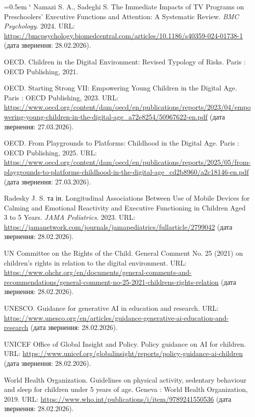 \documentclass[14pt, a4paper]{extreport}
\makeatletter
\renewcommand{\@biblabel}[1]{#1.}
\renewenvironment{thebibliography}[1]
  {\list{\@biblabel{\arabic{enumiv}}}%
     {\settowidth\labelwidth{\@biblabel{#1}}%
      \leftmargin=1.25cm
      \labelsep=0.5em
      \itemsep=0.3\baselineskip
      \parsep=0pt
      \usecounter{enumiv}%
      \let\p@enumiv\@empty
      \renewcommand\theenumiv{\arabic{enumiv}}}%
   \sloppy\clubpenalty4000\widowpenalty4000\sfcode`\.\@m}
  {\endlist}
\makeatother
\begin{document}
\begin{thebibliography}{99}
Namazi S. A., Sadeghi S. The Immediate Impacts of TV Programs on Preschoolers’ Executive Functions and Attention: A Systematic Review. \textit{BMC Psychology}. 2024. URL: \url{https://bmcpsychology.biomedcentral.com/articles/10.1186/s40359-024-01738-1} (дата звернення: 28.02.2026).

OECD. Children in the Digital Environment: Revised Typology of Risks. Paris : OECD Publishing, 2021.

OECD. Starting Strong VII: Empowering Young Children in the Digital Age. Paris : OECD Publishing, 2023. URL: \url{https://www.oecd.org/content/dam/oecd/en/publications/reports/2023/04/empowering-young-children-in-the-digital-age_a72e8254/50967622-en.pdf} (дата звернення: 27.03.2026).

OECD. From Playgrounds to Platforms: Childhood in the Digital Age. Paris : OECD Publishing, 2025. URL: \url{https://www.oecd.org/content/dam/oecd/en/publications/reports/2025/05/from-playgrounds-to-platforms-childhood-in-the-digital-age_cd2b8960/a2c18146-en.pdf} (дата звернення: 27.03.2026).

Radesky J. S. та ін. Longitudinal Associations Between Use of Mobile Devices for Calming and Emotional Reactivity and Executive Functioning in Children Aged 3 to 5 Years. \textit{JAMA Pediatrics}. 2023. URL: \url{https://jamanetwork.com/journals/jamapediatrics/fullarticle/2799042} (дата звернення: 28.02.2026).

UN Committee on the Rights of the Child. General Comment No. 25 (2021) on children’s rights in relation to the digital environment. URL: \url{https://www.ohchr.org/en/documents/general-comments-and-recommendations/general-comment-no-25-2021-childrens-rights-relation} (дата звернення: 28.02.2026).

UNESCO. Guidance for generative AI in education and research. URL: \url{https://www.unesco.org/en/articles/guidance-generative-ai-education-and-research} (дата звернення: 28.02.2026).

UNICEF Office of Global Insight and Policy. Policy guidance on AI for children. URL: \url{https://www.unicef.org/globalinsight/reports/policy-guidance-ai-children} (дата звернення: 28.02.2026).

World Health Organization. Guidelines on physical activity, sedentary behaviour and sleep for children under 5 years of age. Geneva : World Health Organization, 2019. URL: \url{https://www.who.int/publications/i/item/9789241550536} (дата звернення: 28.02.2026).

\end{thebibliography}
\end{document}
